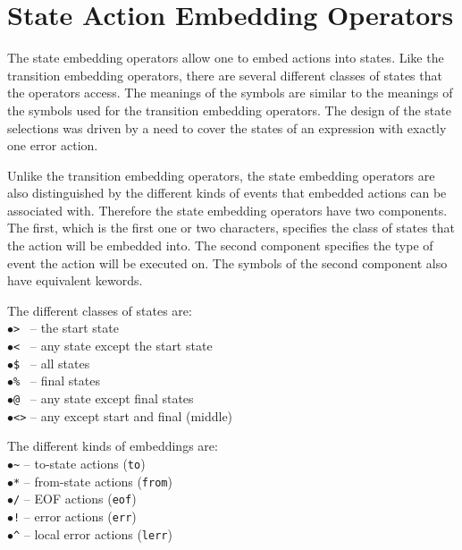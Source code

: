 \documentclass[letterpaper,11pt,oneside]{book}
\begin{document}
\section{State Action Embedding Operators}

The state embedding operators allow one to embed actions into states. Like the
transition embedding operators, there are several different classes of states
that the operators access. The meanings of the symbols are similar to the
meanings of the symbols used for the transition embedding operators. The design
of the state selections was driven by a need to cover the states of an
expression with exactly one error action.

Unlike the transition embedding operators, the state embedding operators are
also distinguished by the different kinds of events that embedded actions can
be associated with. Therefore the state embedding operators have two
components.  The first, which is the first one or two characters, specifies the
class of states that the action will be embedded into. The second component
specifies the type of event the action will be executed on. The symbols of the
second component also have equivalent kewords. 

\vspace{10pt}

\def\fakeitem{\hspace*{12pt}$\bullet$\hspace*{10pt}}

\begin{minipage}{\textwidth}
\begin{multicols}{2}
\raggedcolumns
\noindent The different classes of states are:\\
\fakeitem \verb|> | -- the start state\\
\fakeitem \verb|< | -- any state except the start state\\
\fakeitem \verb|$ | -- all states\\
\fakeitem \verb|% | -- final states\\
\fakeitem \verb|@ | -- any state except final states\\
\fakeitem \verb|<>| -- any except start and final (middle)

\columnbreak

\noindent The different kinds of embeddings are:\\
\fakeitem \verb|~| -- to-state actions (\verb|to|)\\
\fakeitem \verb|*| -- from-state actions (\verb|from|)\\
\fakeitem \verb|/| -- EOF actions (\verb|eof|)\\
\fakeitem \verb|!| -- error actions (\verb|err|)\\
\fakeitem \verb|^| -- local error actions (\verb|lerr|)\\
\end{multicols}
\end{minipage}
\end{document}
